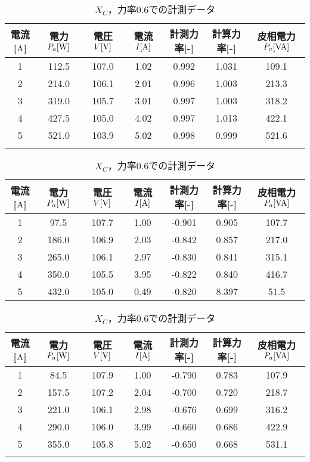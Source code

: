 \begin{itemize}
\begin{table}[h]
\centering
	\caption{$X_{C}$，力率$1.0$での計測データ}
	\label{tab:1.0data2}
\begin{tabular}{ccccccc}
	\hline
	電流[$\rm{A}$] & 電力$P_a[\rm{W}]$ & 電圧$V[\rm{V}]$ & 電流$I[\rm{A}]$ & 計測力率[-] & 計算力率[-] & 皮相電力$P_a[\rm{VA}]$ \\ \hline
	1 & 112.5 & 107.0 & 1.02 & 0.992 & 1.031 & 109.1 \\
	2 & 214.0 & 106.1 & 2.01 & 0.996 & 1.003 & 213.3 \\
	3 & 319.0 & 105.7 & 3.01 & 0.997 & 1.003 & 318.2 \\
	4 & 427.5 & 105.0 & 4.02 & 0.997 & 1.013 & 422.1 \\
	5 & 521.0 & 103.9 & 5.02 & 0.998 & 0.999 & 521.6 \\ \hline\\
\end{tabular}
	\caption{$X_{C}$，力率$0.8$での計測データ}
	\label{tab:0.8data2}
\begin{tabular}{ccccccc}
	\hline
	電流[$\rm{A}$] & 電力$P_a[\rm{W}]$ & 電圧$V[\rm{V}]$ & 電流$I[\rm{A}]$ & 計測力率[-] & 計算力率[-] & 皮相電力$P_a[\rm{VA}]$ \\ \hline
	1 & 97.5  & 107.7 & 1.00 & -0.901 & 0.905 & 107.7 \\
	2 & 186.0 & 106.9 & 2.03 & -0.842 & 0.857 & 217.0 \\
	3 & 265.0 & 106.1 & 2.97 & -0.830 & 0.841 & 315.1 \\
	4 & 350.0 & 105.5 & 3.95 & -0.822 & 0.840 & 416.7 \\
	5 & 432.0 & 105.0 & 0.49 & -0.820 & 8.397 & 51.5  \\ \hline
\end{tabular}
	\caption{$X_{C}$，力率$0.6$での計測データ}
	\label{tab:0.6data2}
\begin{tabular}{ccccccc}
	\hline
	電流[$\rm{A}$] & 電力$P_a[\rm{W}]$ & 電圧$V[\rm{V}]$ & 電流$I[\rm{A}]$ & 計測力率[-] & 計算力率[-] & 皮相電力$P_a[\rm{VA}]$ \\ \hline
	1 & 84.5  & 107.9 & 1.00 & -0.790 & 0.783 & 107.9 \\
	2 & 157.5 & 107.2 & 2.04 & -0.700 & 0.720 & 218.7 \\
	3 & 221.0 & 106.1 & 2.98 & -0.676 & 0.699 & 316.2 \\
	4 & 290.0 & 106.0 & 3.99 & -0.660 & 0.686 & 422.9 \\
	5 & 355.0 & 105.8 & 5.02 & -0.650 & 0.668 & 531.1 \\ \hline\\
\end{tabular}

\end{table}
\end{itemize}
